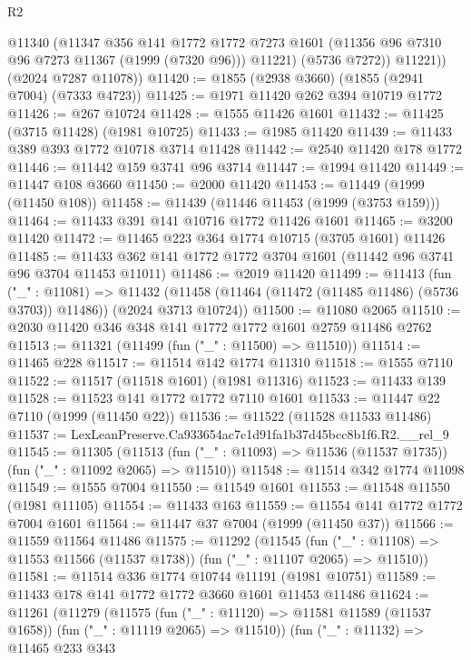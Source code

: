 \begin{lexlean}{R2}
\begin{coremodule}
            @11340
            (@11347
              @356
              @141
              @1772
              @1772
              @7273
              @1601
              (@11356 @96 @7310 @96 @7273 @11367 (@1999 (@7320 @96)))
              @11221)
            (@5736 @7272))
          @11221))
      (@2024 @7287 @11078))
@11420 := @1855 (@2938 @3660) (@1855 (@2941 @7004) (@7333 @4723))
@11425 := @1971 @11420 @262 @394 @10719 @1772
@11426 := @267 @10724
@11428 := @1555 @11426 @1601
@11432 := @11425 (@3715 @11428) (@1981 @10725)
@11433 := @1985 @11420
@11439 := @11433 @389 @393 @1772 @10718 @3714 @11428
@11442 := @2540 @11420 @178 @1772
@11446 := @11442 @159 @3741 @96 @3714
@11447 := @1994 @11420
@11449 := @11447 @108 @3660
@11450 := @2000 @11420
@11453 := @11449 (@1999 (@11450 @108))
@11458 := @11439 (@11446 @11453 (@1999 (@3753 @159)))
@11464 := @11433 @391 @141 @10716 @1772 @11426 @1601
@11465 := @3200 @11420
@11472 := @11465 @223 @364 @1774 @10715 (@3705 @1601) @11426
@11485 := @11433 @362 @141 @1772 @1772 @3704 @1601 (@11442 @96 @3741 @96 @3704 @11453 @11011)
@11486 := @2019 @11420
@11499 := @11413
    (fun ("_" : @11081) =>
    @11432 (@11458 (@11464 (@11472 (@11485 @11486) (@5736 @3703)) @11486)) (@2024 @3713 @10724))
@11500 := @11080 @2065
@11510 := @2030 @11420 @346 @348 @141 @1772 @1772 @1601 @2759 @11486 @2762
@11513 := @11321 (@11499 (fun ("_" : @11500) => @11510))
@11514 := @11465 @228
@11517 := @11514 @142 @1774 @11310
@11518 := @1555 @7110
@11522 := @11517 (@11518 @1601) (@1981 @11316)
@11523 := @11433 @139
@11528 := @11523 @141 @1772 @1772 @7110 @1601
@11533 := @11447 @22 @7110 (@1999 (@11450 @22))
@11536 := @11522 (@11528 @11533 @11486)
@11537 := LexLeanPreserve.Ca933654ac7c1d91fa1b37d45bcc8b1f6.R2.__rel_9
@11545 := @11305
    (@11513 (fun ("_" : @11093) => @11536 (@11537 @1735)) (fun ("_" : @11092 @2065) => @11510))
@11548 := @11514 @342 @1774 @11098
@11549 := @1555 @7004
@11550 := @11549 @1601
@11553 := @11548 @11550 (@1981 @11105)
@11554 := @11433 @163
@11559 := @11554 @141 @1772 @1772 @7004 @1601
@11564 := @11447 @37 @7004 (@1999 (@11450 @37))
@11566 := @11559 @11564 @11486
@11575 := @11292
    (@11545
      (fun ("_" : @11108) => @11553 @11566 (@11537 @1738))
      (fun ("_" : @11107 @2065) => @11510))
@11581 := @11514 @336 @1774 @10744 @11191 (@1981 @10751)
@11589 := @11433 @178 @141 @1772 @1772 @3660 @1601 @11453 @11486
@11624 := @11261
    (@11279
      (@11575
        (fun ("_" : @11120) => @11581 @11589 (@11537 @1658))
        (fun ("_" : @11119 @2065) => @11510))
      (fun ("_" : @11132) =>
      @11465
        @233
        @343

\end{coremodule}
\end{lexlean}
